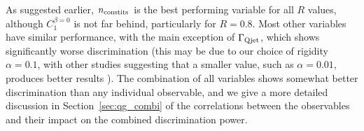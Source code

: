 %
As suggested earlier, $n_{\rm constits}$ is the best performing variable for all $R$ values, although $C_1^{\beta=0}$ is not far behind, particularly
for $R=0.8$. Most other variables have similar performance, with the main exception of $\Gamma_{\rm Qjet}$, which shows significantly worse
discrimination (this may be due to our choice of
rigidity $\alpha = 0.1$, with other studies suggesting that a smaller value,
such as $\alpha = 0.01$, produces better results \cite{Ellis:2012sn,Ellis:2014eya}). The combination of all variables shows somewhat better discrimination than any individual observable, and
we  give a more detailed discussion in Section~\ref{sec:qg_combi} of the correlations between the observables and their impact on the combined discrimination power.

%
\begin{figure}
\centering
{}
\\
\\

\end{figure}
